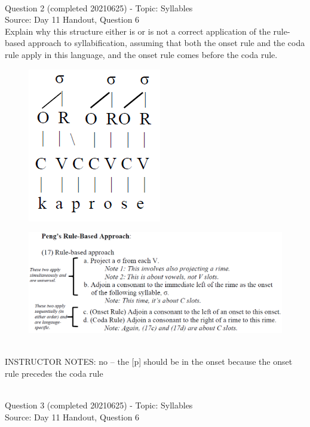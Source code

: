 \documentclass[12pt]{article}
\begin{document}
~\\

{\large Question 2} (completed 20210625) - Topic: Syllables\\
Source: Day 11 Handout, Question 6\\

Explain why this structure either is or is not a correct application of the rule-based approach to syllabification, assuming that both the onset rule and the coda rule apply in this language, and the onset rule comes before the coda rule.\\

\begin{figure}[H]
\includegraphics{../images/pengrules_kaprose_no.png}
\end{figure}
\begin{figure}[H]
\includegraphics{../images/peng_rules.png}
\end{figure}

~\\
INSTRUCTOR NOTES: no -- the [p] should be in the onset because the onset rule precedes the coda rule


~\\

{\large Question 3} (completed 20210625) - Topic: Syllables\\
Source: Day 11 Handout, Question 6\\
\end{document}
